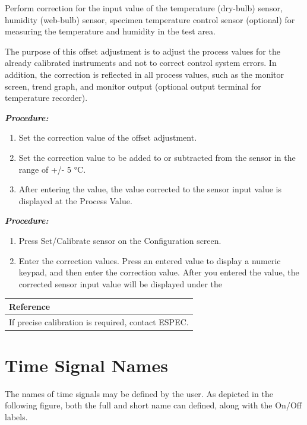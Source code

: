 Perform correction for the input value of the temperature (dry-bulb)
sensor, humidity (web-bulb) sensor, specimen temperature control sensor
(optional) for measuring the temperature and humidity in the test area.

The purpose of this offset adjustment is to adjust the process values
for the already calibrated instruments and not to correct control system
errors. In addition, the correction is reflected in all process values,
such as the monitor screen, trend graph, and monitor output (optional
output terminal for temperature recorder).

\textbf{\emph{Procedure:}}

\begin{enumerate}
\def\labelenumi{\arabic{enumi}.}
\tightlist
\item
  Set the correction value of the offset adjustment.
\item
  Set the correction value to be added to or subtracted from the sensor
  in the range of +/- 5 °C.
\item
  After entering the value, the value corrected to the sensor input
  value is displayed at the Process Value.
\end{enumerate}

\textbf{\emph{Procedure:}}

\begin{enumerate}
\def\labelenumi{\arabic{enumi}.}
\tightlist
\item
  Press Set/Calibrate sensor on the Configuration screen.
\item
  Enter the correction values. Press an entered value to display a
  numeric keypad, and then enter the correction value. After you entered
  the value, the corrected sensor input value will be displayed under
  the
\end{enumerate}

\begin{longtable}[]{@{}l@{}}
\toprule
\textbf{Reference}\tabularnewline
\midrule
\endhead
If precise calibration is required, contact ESPEC.\tabularnewline
\bottomrule
\end{longtable}


\section{Time Signal Names}

The names of time signals may be defined by the user. As depicted in the
following figure, both the full and short name can defined, along with
the On/Off labels.

